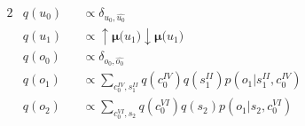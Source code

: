 \documentclass[fleqn]{article}
\begin{document}
\begin{minipage}[t]{0.5\textwidth}
\begin{alignat}{2}
         & q(u_0)                                                           &  & \propto \delta_{u_0,\hat{u_0}}                                                                                                                                                                      \\
         & q(u_1)                                                           &  & \propto \bm{{\uparrow}{\mu}(}u_1\bm{)} \bm{{\downarrow}{\mu}(}u_1\bm{)}                                                                                                                             \\
         & q(o_0)                                                           &  & \propto \delta_{o_0,\hat{o_0}}                                                                                                                                                                      \\
         & q(o_1)                                                           &  & \propto \sum_{c^{\scriptscriptstyle IV}_0,s^{\scriptscriptstyle II}_1} q(c^{\scriptscriptstyle IV}_0) q(s^{\scriptscriptstyle II}_1) p(o_1|s^{\scriptscriptstyle II}_1,c^{\scriptscriptstyle IV}_0) \\
         & q(o_2)                                                           &  & \propto \sum_{c^{\scriptscriptstyle VI}_0,s_2} q(c^{\scriptscriptstyle VI}_0) q(s_2) p(o_1|s_2,c^{\scriptscriptstyle VI}_0)
    \end{alignat}
\end{minipage}
\end{document}
